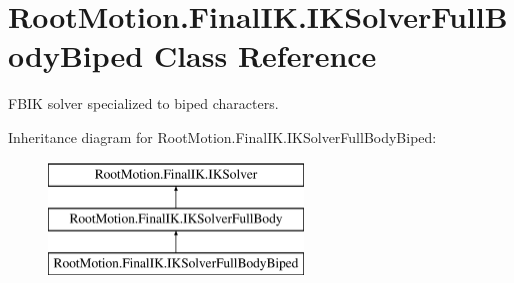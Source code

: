\hypertarget{class_root_motion_1_1_final_i_k_1_1_i_k_solver_full_body_biped}{}\section{Root\+Motion.\+Final\+I\+K.\+I\+K\+Solver\+Full\+Body\+Biped Class Reference}
\label{class_root_motion_1_1_final_i_k_1_1_i_k_solver_full_body_biped}


F\+B\+IK solver specialized to biped characters.  


Inheritance diagram for Root\+Motion.\+Final\+I\+K.\+I\+K\+Solver\+Full\+Body\+Biped\+:\begin{figure}[H]
\begin{center}
\leavevmode
\includegraphics[height=3.000000cm]{class_root_motion_1_1_final_i_k_1_1_i_k_solver_full_body_biped}
\end{center}
\end{figure}
